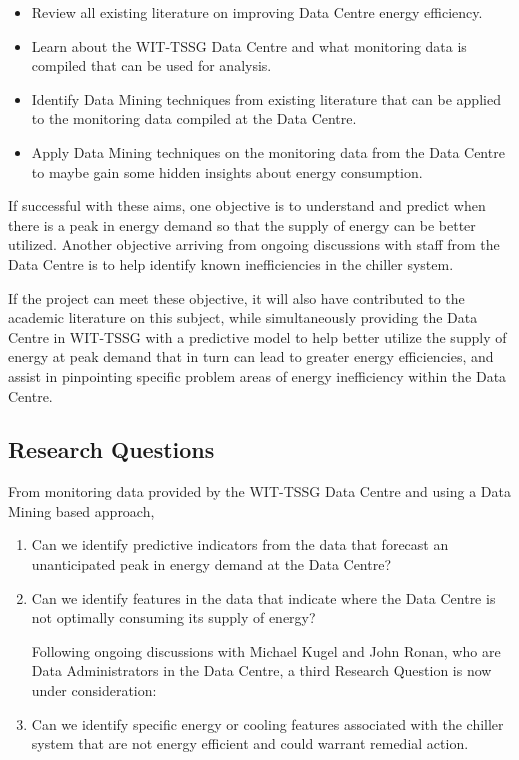 \documentclass[12pt]{scrartcl}
\begin{document}
\begin{itemize}
\item Review all existing literature on improving Data Centre energy efficiency.
\item Learn about the WIT-TSSG Data Centre and what monitoring data is compiled that can be used for analysis.
\item Identify Data Mining techniques from existing literature that can be applied to the monitoring data compiled at the Data Centre.
\item Apply Data Mining techniques on the monitoring data from the Data Centre to maybe gain some hidden insights about energy consumption.
\end{itemize}

If successful with these aims, one objective is to understand and predict when there is a peak in energy demand so that the supply of energy can be better utilized. Another objective arriving from ongoing discussions with staff from the Data Centre is to help identify known inefficiencies in the chiller system.  

If the project can meet these objective, it will also have contributed to the academic literature on this subject, while simultaneously providing the Data Centre in WIT-TSSG with a predictive model to help better utilize the supply of energy at peak demand that in turn can lead to greater energy efficiencies, and assist in pinpointing specific problem areas of energy inefficiency within the Data Centre. 
 

\subsection{Research Questions}
\label{subsec:[Research Questions]}

From monitoring data provided by the WIT-TSSG Data Centre and using a Data Mining based approach,
\begin{enumerate}
  \item Can we identify predictive indicators from the data that forecast an unanticipated peak in energy demand at the Data Centre?
  \item Can we identify features in the data that indicate where the Data Centre is not optimally consuming its supply of energy?

Following ongoing discussions with Michael Kugel and John Ronan, who are Data Administrators in the Data Centre, a third Research Question is now under consideration:

 \item Can we identify specific energy or cooling features associated with the chiller system that are not energy efficient and could warrant remedial action.
\end{enumerate}
\end{document}
